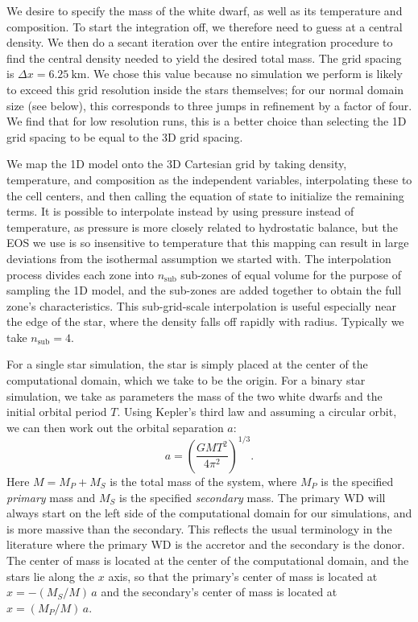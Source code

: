 \documentclass[iop]{emulateapj}
\begin{document}
We desire to specify the mass of the white dwarf, as well as its
temperature and composition. To start the integration off, we
therefore need to guess at a central density.  We then do a secant
iteration over the entire integration procedure to find the central
density needed to yield the desired total mass.  The grid spacing is
$\Delta x = 6.25\ \text{km}$. We chose this value because no simulation
we perform is likely to exceed this grid resolution inside the stars 
themselves; for our normal domain size (see below), this corresponds to 
three jumps in refinement by a factor of four. We find that for low 
resolution runs, this is a better choice than selecting the 1D grid 
spacing to be equal to the 3D grid spacing.

We map the 1D model onto the 3D Cartesian grid by taking density,
temperature, and composition as the independent variables,
interpolating these to the cell centers, and then calling the equation
of state to initialize the remaining terms. It is possible to interpolate
instead by using pressure instead of temperature, as pressure is more 
closely related to hydrostatic balance, but the EOS we use is so 
insensitive to temperature that this mapping can result in large 
deviations from the isothermal assumption we started with.  The 
interpolation process divides each zone into $n_{\text{sub}}$ 
sub-zones of equal volume for
the purpose of sampling the 1D model, and the sub-zones are added
together to obtain the full zone's characteristics. This
sub-grid-scale interpolation is useful especially near the edge of the star,
where the density falls off rapidly with radius. Typically we take 
$n_{\text{sub}} = 4$.

For a single star simulation, the star is simply placed at the center
of the computational domain, which we take to be the origin. For a
binary star simulation, we take as parameters the mass of the two
white dwarfs and the initial orbital period $T$. Using Kepler's third
law and assuming a circular orbit, we can then work out the orbital
separation $a$:
\begin{equation}
  a = \left(\frac{GM T^2}{4\pi^2}\right)^{1/3}.
\end{equation}
Here $M = M_P + M_S$ is the total mass of the system, where $M_P$ is
the specified \textit{primary} mass and $M_S$ is the specified
\textit{secondary} mass. The primary WD will always start on the left
side of the computational domain for our simulations, and is more
massive than the secondary. This reflects the usual terminology in the
literature where the primary WD is the accretor and the secondary is
the donor. The center of mass is located at the center of the
computational domain, and the stars lie along the $x$ axis, so that
the primary's center of mass is located at $x = -(M_S / M)\, a$ and
the secondary's center of mass is located at $x = (M_P / M)\, a$.
\end{document}
